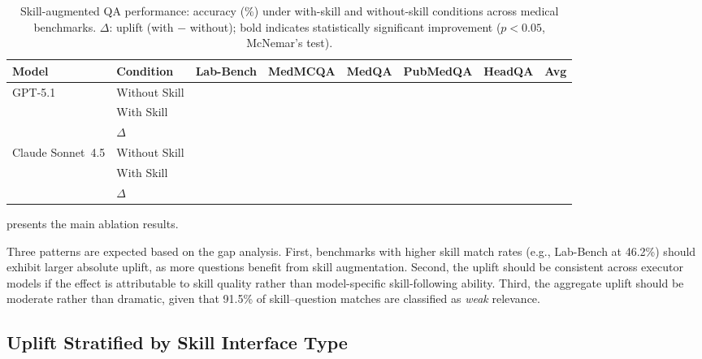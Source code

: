 \begin{table}[!t]
\centering\small
\caption{Skill-augmented QA performance: accuracy (\%) under with-skill and without-skill conditions across medical benchmarks.
$\Delta$: uplift (with $-$ without); bold indicates statistically significant improvement ($p < 0.05$, McNemar's test).}
\begin{tabular}{llcccccc}
\toprule
\textbf{Model} & \textbf{Condition} & \textbf{Lab-Bench} & \textbf{MedMCQA} & \textbf{MedQA} & \textbf{PubMedQA} & \textbf{HeadQA} & \textbf{Avg} \\
\midrule
\multirow{3}{*}{GPT-5.1}
  & Without Skill & \todo{} & \todo{} & \todo{} & \todo{} & \todo{} & \todo{} \\
  & With Skill    & \todo{} & \todo{} & \todo{} & \todo{} & \todo{} & \todo{} \\
  & $\Delta$      & \todo{} & \todo{} & \todo{} & \todo{} & \todo{} & \todo{} \\
\midrule
\multirow{3}{*}{Claude Sonnet~4.5}
  & Without Skill & \todo{} & \todo{} & \todo{} & \todo{} & \todo{} & \todo{} \\
  & With Skill    & \todo{} & \todo{} & \todo{} & \todo{} & \todo{} & \todo{} \\
  & $\Delta$      & \todo{} & \todo{} & \todo{} & \todo{} & \todo{} & \todo{} \\
\bottomrule
\end{tabular}
\label{tab:ablation_main}
\end{table}

 presents the main ablation results.

Three patterns are expected based on the \rbu gap analysis.
First, benchmarks with higher skill match rates (e.g., Lab-Bench at 46.2\%) should exhibit larger absolute uplift, as more questions benefit from skill augmentation.
Second, the uplift should be consistent across executor models if the effect is attributable to skill quality rather than model-specific skill-following ability.
Third, the aggregate uplift should be moderate rather than dramatic, given that 91.5\% of skill--question matches are classified as \emph{weak} relevance.

\subsection{Uplift Stratified by Skill Interface Type}
\label{ssec:uplift_stratified}

